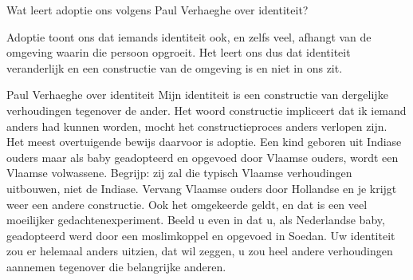 \documentclass[main.tex]{subfiles}
\begin{document}
\begin{examenvraag}
    \begin{vraag}
        Wat leert adoptie ons volgens Paul Verhaeghe over identiteit?
    \end{vraag}

    \begin{antwoord}
        Adoptie toont ons dat iemands identiteit ook, en zelfs veel, afhangt van de omgeving waarin die persoon opgroeit. Het leert ons dus dat identiteit veranderlijk en een constructie van de omgeving is en niet in ons zit.
        \begin{citaat}{Paul Verhaeghe over identiteit}
            Mijn identiteit is een constructie van dergelijke verhoudingen tegenover de ander.
            Het woord constructie impliceert dat ik iemand anders had kunnen worden, mocht het constructieproces anders verlopen zijn.
            Het meest overtuigende bewijs daarvoor is adoptie.
            Een kind geboren uit Indiase ouders maar als baby geadopteerd en opgevoed door Vlaamse ouders, wordt een Vlaamse volwassene.
            Begrijp: zij zal die typisch Vlaamse verhoudingen uitbouwen, niet de Indiase.
            Vervang Vlaamse ouders door Hollandse en je krijgt weer een andere constructie.
            Ook het omgekeerde geldt, en dat is een veel moeilijker gedachtenexperiment.
            Beeld u even in dat u, als Nederlandse baby, geadopteerd werd door een moslimkoppel en opgevoed in Soedan. 
            Uw identiteit zou er helemaal anders uitzien, dat wil zeggen, u zou heel andere verhoudingen aannemen tegenover die belangrijke anderen.
        \end{citaat}
    \end{antwoord}
\end{examenvraag}
\end{document}
